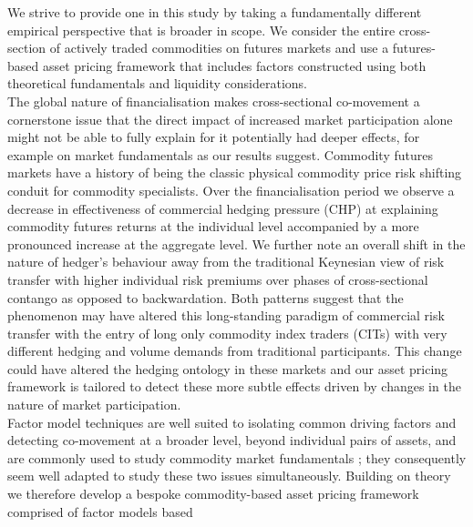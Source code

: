 \documentclass[
  authoryear,
  preprint,
  3p]{elsarticle}
\begin{document}
We strive to provide one in this study by taking a fundamentally
different empirical perspective that is broader in scope. We consider
the entire cross-section of actively traded commodities on futures
markets and use a futures-based asset pricing framework that includes
factors constructed using both theoretical fundamentals and liquidity
considerations.\\
The global nature of financialisation makes cross-sectional co-movement
a cornerstone issue that the direct impact of increased market
participation alone might not be able to fully explain for it
potentially had deeper effects, for example on market fundamentals as
our results suggest. Commodity futures markets have a history of being
the classic physical commodity price risk shifting conduit for commodity
specialists. Over the financialisation period we observe a decrease in
effectiveness of commercial hedging pressure (CHP) at explaining
commodity futures returns at the individual level accompanied by a more
pronounced increase at the aggregate level. We further note an overall
shift in the nature of hedger's behaviour away from the traditional
Keynesian view of risk transfer with higher individual risk premiums
over phases of cross-sectional contango as opposed to backwardation.
Both patterns suggest that the phenomenon may have altered this
long-standing paradigm of commercial risk transfer with the entry of
long only commodity index traders (CITs) with very different hedging and
volume demands from traditional participants. This change could have
altered the hedging ontology in these markets and our asset pricing
framework is tailored to detect these more subtle effects driven by
changes in the nature of market participation.\\
Factor model techniques are well suited to isolating common driving
factors and detecting co-movement
\citep{fama_common_1993, carhart_persistence_1997, asness_devil_2013, fama_five_factor_2015, hou_digesting_2015, asness_fact_2015, frazzini_betting_2014, asness_quality_2019}
at a broader level, beyond individual pairs of assets, and are commonly
used to study commodity market fundamentals
\citep{schwartz_short_2000, miffre_momentum_2007, gorton_fundamentals_2012, cortazar_commodity_2013, yang_investment_2013, daskalaki_factors_2014, szymanowska_anatomy_2014, fernandez_skewness_2018, bakshi_understanding_2019, boons_basis_2019, sakkas_factor_2020};
they consequently seem well adapted to study these two issues
simultaneously. Building on theory we therefore develop a bespoke
commodity-based asset pricing framework comprised of factor models based
\end{document}
